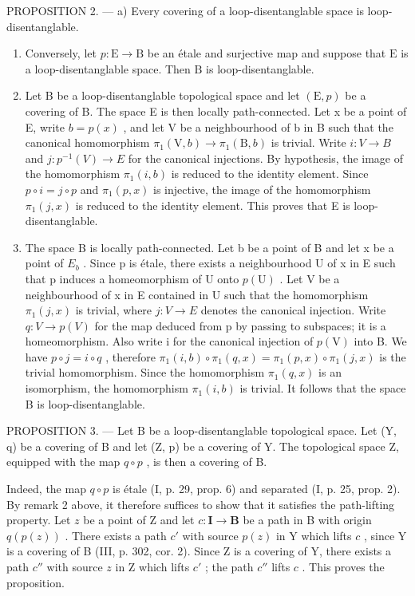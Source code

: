 PROPOSITION 2. --- a) Every covering of a loop-disentanglable space is loop-disentanglable.

\begin{enumerate}
\def\labelenumi{\alph{enumi})}
\setcounter{enumi}{1}
\item
  Conversely, let \(p \colon \mathrm{E} \to \mathrm{B}\) be an étale and surjective map and suppose that \(\mathrm{E}\) is a loop-disentanglable space. Then \(\mathrm{B}\) is loop-disentanglable.
\item
  Let B be a loop-disentanglable topological space and let \((\mathrm{E}, p)\) be a covering of B. The space E is then locally path-connected. Let x be a point of E, write \(b = p(x)\) , and let V be a neighbourhood of b in B such that the canonical homomorphism \(\pi_{1}(\mathrm{V}, b) \to \pi_{1}(\mathrm{B}, b)\) is trivial. Write \(i: V \to B\) and \(j: p^{-1}(V) \to E\) for the canonical injections. By hypothesis, the image of the homomorphism \(\pi_{1}(i, b)\) is reduced to the identity element. Since \(p \circ i = j \circ p\) and \(\pi_{1}(p, x)\) is injective, the image of the homomorphism \(\pi_{1}(j, x)\) is reduced to the identity element. This proves that E is loop-disentanglable.
\item
  The space B is locally path-connected. Let b be a point of B and let x be a point of \(E_{b}\) . Since p is étale, there exists a neighbourhood U of x in E such that p induces a homeomorphism of U onto \(p(\mathrm{U})\) . Let V be a neighbourhood of x in E contained in U such that the homomorphism \(\pi_{1}(j,x)\) is trivial, where \(j:V\to E\) denotes the canonical injection. Write \(q:V\to p(V)\) for the map deduced from p by passing to subspaces; it is a homeomorphism. Also write i for the canonical injection of \(p(\mathrm{V})\) into B. We have \(p\circ j=i\circ q\) , therefore \(\pi_{1}(i,b)\circ\pi_{1}(q,x)=\pi_{1}(p,x)\circ\pi_{1}(j,x)\) is the trivial homomorphism. Since the homomorphism \(\pi_{1}(q,x)\) is an isomorphism, the homomorphism \(\pi_{1}(i,b)\) is trivial. It follows that the space B is loop-disentanglable.
\end{enumerate}

PROPOSITION 3. --- Let B be a loop-disentanglable topological space. Let (Y, q) be a covering of B and let (Z, p) be a covering of Y. The topological space Z, equipped with the map \(q \circ p\) , is then a covering of B.

Indeed, the map \(q \circ p\) is étale (I, p. 29, prop. 6) and separated (I, p. 25, prop. 2). By remark 2 above, it therefore suffices to show that it satisfies the path-lifting property. Let \(z\) be a point of Z and let \(c \colon \mathbf{I} \to \mathbf{B}\) be a path in B with origin \(q(p(z))\) . There exists a path \(c'\) with source \(p(z)\) in Y which lifts \(c\) , since Y is a covering of B (III, p. 302, cor. 2). Since Z is a covering of Y, there exists a path \(c''\) with source \(z\) in Z which lifts \(c'\) ; the path \(c''\) lifts \(c\) . This proves the proposition.

